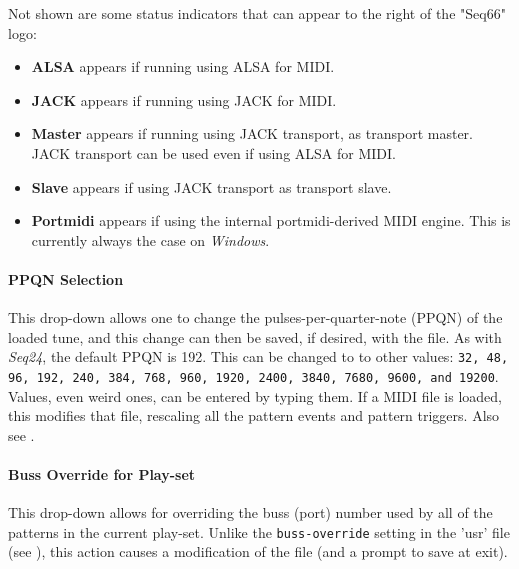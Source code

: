 \documentclass[
 11pt,
 twoside,
 a4paper,
 final                                 %
]{article}
\begin{document}
   Not shown are some status indicators that can appear to the right of the
   "Seq66" logo:

   \begin{itemize}
      \item \textbf{ALSA} appears if running using ALSA for MIDI.
      \item \textbf{JACK} appears if running using JACK for MIDI.
      \item \textbf{Master} appears if running using JACK transport, as
         transport master.
         JACK transport can be used even if using ALSA for MIDI.
      \item \textbf{Slave} appears if using JACK transport as transport slave.
      \item \textbf{Portmidi} appears if using the internal portmidi-derived
         MIDI engine.  This is currently always the case on \textsl{Windows}.
   \end{itemize}


\paragraph{PPQN Selection}
\label{paragraph:introduction_ppqn_selection}

   This drop-down allows one to change the pulses-per-quarter-note (PPQN) of the
   loaded tune, and this change can then be saved, if desired, with the file.
   As with \textsl{Seq24}, the default PPQN is 192.  This can be changed to
   to other values:
   \texttt{32, 48, 96, 192, 240, 384, 768, 960, 1920, 2400, 3840,
   7680, 9600, and 19200}.
   Values, even weird ones, can be entered by typing them.
   If a MIDI file is loaded, this modifies that file, rescaling all the
   pattern events and pattern triggers.
   Also see .

\paragraph{Buss Override for Play-set}
\label{paragraph:introduction_sets_buss_override}

   This drop-down allows for overriding the buss (port) number used by all of
   the patterns in the current play-set.
   Unlike the \texttt{buss-override} setting in the 'usr' file
   (see ),
   this action causes a modification of the file (and a prompt to save at
   exit).
\end{document}
